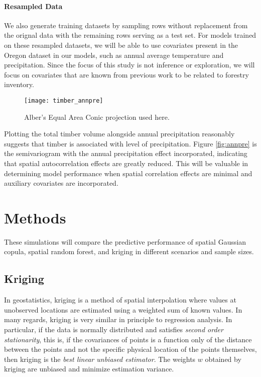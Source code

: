 \documentclass{article}
\begin{document}
\paragraph{Resampled Data} We also generate training datasets by sampling rows without replacement from the orignal data with the remaining rows serving as a test set.
For models trained on these resampled datasets, we will be able to use covariates present in the Oregon dataset in our models, such as annual average temperature and precipitation.
Since the focus of this study is not inference or exploration, we will focus on covariates that are known from previous work\cite{madsen09} to be related to forestry inventory.

\begin{center}
	\begin{figure}[ht]
		\texttt{[image: timber\_annpre]}
		\caption{Alber's Equal Area Conic projection used here.}
	\end{figure}
\end{center}

Plotting the total timber volume alongside annual precipitation reasonably suggests that timber is associated with level of precipitation.
Figure \ref{fig:annpre} is the semivariogram with the annual precipitation effect incorporated, indicating that spatial autocorrelation effects are greatly reduced.
This will be valuable in determining model performance when spatial correlation effects are minimal and auxiliary covariates are incorporated.

\section{Methods}
These simulations will compare the predictive performance of spatial Gaussian copula, spatial random forest, and kriging in different scenarios and sample sizes.

\subsection{Kriging}
In geostatistics, kriging is a method of spatial interpolation where values at unobserved locations are estimated using a weighted sum of known values.
In many regards, kriging is very similar in principle to regression analysis.
In particular, if the data is normally distributed and satisfies \textit{second order stationarity}, this is, if the covariances of points is a function only of the distance between the points and not the specific physical location of the points themselves, then kriging is the \textit{best linear unbiased estimator}\cite{cressie93}.
The weights $w$ obtained by kriging are unbiased and minimize estimation variance.
\end{document}
